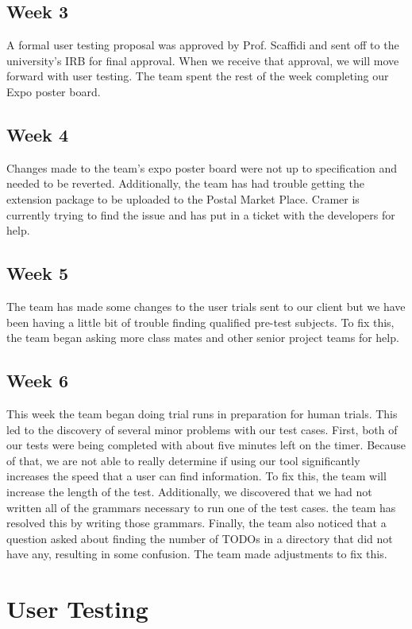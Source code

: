 \documentclass[letterpaper,10pt,titlepage,draftclsnofoot,onecolumn,onesided] {IEEEtran}
\begin{document}
	\subsection{Week 3}
	A formal user testing proposal was approved by Prof. Scaffidi and sent off to the university's IRB for final approval. 
	When we receive that approval, we will move forward with user testing.
	The team spent the rest of the week completing our Expo poster board.
	
	\subsection{Week 4}
	Changes made to the team's expo poster board were not up to specification and needed to be reverted.
	Additionally, the team has had trouble getting the extension package to be uploaded to the Postal Market Place.
	Cramer is currently trying to find the issue and has put in a ticket with the developers for help.
	
	\subsection{Week 5}
	The team has made some changes to the user trials sent to our client but we have been having a little bit of trouble finding qualified pre-test subjects.
	To fix this, the team began asking more class mates and other senior project teams for help.
	
	\subsection{Week 6}
	This week the team began doing trial runs in preparation for human trials.
	This led to the discovery of several minor problems with our test cases.
	First, both of our tests were being completed with about five minutes left on the timer.
	Because of that, we are not able to really determine if using our tool significantly increases the speed that a user can find information.
	To fix this, the team will increase the length of the test.
	Additionally, we discovered that we had not written all of the grammars necessary to run one of the test cases. 
	the team has resolved this by writing those grammars.
	Finally, the team also noticed that a question asked about finding the number of TODOs in a directory that did not have any, resulting in some confusion.
	The team made adjustments to fix this.
	
\section{User Testing}
\end{document}
